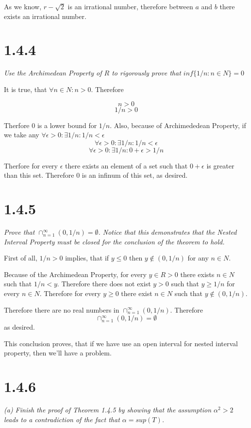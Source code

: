 \documentclass[11pt,oneside,titlepage]{book}
\begin{document}
As we know, $r - \sqrt{2}$ is an irrational number, therefore between $a$ and
$b$ there exists an irrational number.

\section*{1.4.4}
\textit{Use the Archimedean Property of $R$ to rigorously prove that
  $inf\{1/n: n \in N\} = 0$}

It is true, that $\forall n \in N: n > 0$. Therefore

$$n > 0$$
$$1/n > 0$$

Therfore 0 is a lower bound for $1/n$. Also, because of Archimededean Property,
if we take any $\forall \epsilon > 0: \exists 1/n: 1/n < \epsilon $
$$\forall \epsilon > 0: \exists 1/n: 1/n < \epsilon $$
$$\forall \epsilon > 0: \exists 1/n: 0 + \epsilon > 1/n $$


Therfore for every $\epsilon$ there exists an element of a set such that
$0 + \epsilon$ is greater than this set. Therefore 0 is an infinum of this set,
as desired.

\section*{1.4.5}
\textit{Prove that $\cap^{\infty}_{n = 1}(0, 1/n) = \emptyset$. Notice that
  this demonstrates that the Nested Interval Property must be closed for the
  conclusion of the theorem to hold.}

First of all, $1/n > 0$ implies, that if $y \leq 0$ then $y \notin (0, 1/n)$
for any $n \in N$.

Because of the Archimedean Property, for every $y \in R > 0$ there exists
$n \in N$ such that $1/n < y$. Therefore there does not exist $y > 0$ such
that $y \geq 1/n$ for every $n \in N$. Therefore for every $y \geq 0$ there
exist $n \in N$ such that $y \notin (0, 1/n)$.

Therefore there are no real
numbers in $\cap^{\infty}_{n = 1}(0, 1/n)$. Therefore 
$$\cap^{\infty}_{n = 1}(0, 1/n) = \emptyset$$
as desired.

This conclusion proves, that if we have use an open interval for nested
interval property, then we'll have a problem.

\section*{1.4.6}
\textit{(a) Finish the proof of Theorem 1.4.5 by showing that the assumption
  $\alpha ^ 2 > 2$ leads to a contradiction of the fact that
  $\alpha = sup(T)$.}
\end{document}
